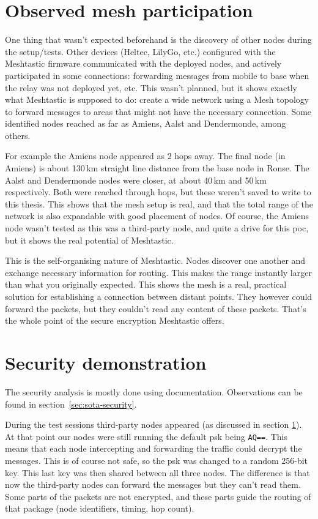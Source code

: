 \section{Observed mesh participation}%
\label{sec:poc-mesh}

One thing that wasn't expected beforehand is the discovery of other nodes during the setup/tests.
Other devices (Heltec, LilyGo, etc.) configured with the Meshtastic firmware communicated with the deployed nodes, and actively participated in some connections: forwarding messages from mobile to base when the relay was not deployed yet, etc.
This wasn't planned, but it shows exactly what Meshtastic is supposed to do: create a wide network using a Mesh topology to forward messages to areas that might not have the necessary connection.
Some identified nodes reached as far as Amiens, Aalst and Dendermonde, among others.

For example the Amiens node appeared as 2 hops away. The final node (in Amiens) is about 130\,km straight line distance from the base node in Ronse. The Aalst and Dendermonde nodes were closer, at about 40\,km and 50\,km respectively. Both were reached through hops, but these weren't saved to write to this thesis.
This shows that the mesh setup is real, and that the total range of the network is also expandable with good placement of nodes.
Of course, the Amiens node wasn't tested as this was a third-party node, and quite a drive for this \gls{poc}, but it shows the real potential of Meshtastic.

This is the self-organising nature of Meshtastic. Nodes discover one another and exchange necessary information for routing. This makes the range instantly larger than what you originally expected.
This shows the mesh is a real, practical solution for establishing a connection between distant points. They however could forward the packets, but they couldn't read any content of these packets.
That's the whole point of the secure encryption Meshtastic offers.

\section{Security demonstration}%
\label{sec:poc-security}

The security analysis is mostly done using documentation. Observations can be found in section~\ref{sec:sota-security}.

During the test sessions third-party nodes appeared (as discussed in section \ref{sec:poc-mesh}). At that point our nodes were still running the
default \gls{psk} being \texttt{AQ==}. This means that each node intercepting and forwarding the traffic could decrypt the messages. This is of course not safe, so the \gls{psk} was changed to a random 256-bit key.
This last key was then shared between all three nodes.
The difference is that now the third-party nodes can forward the messages but they can't read them.
Some parts of the packets are not encrypted, and these parts guide the routing of that package (node identifiers, timing, hop count).

